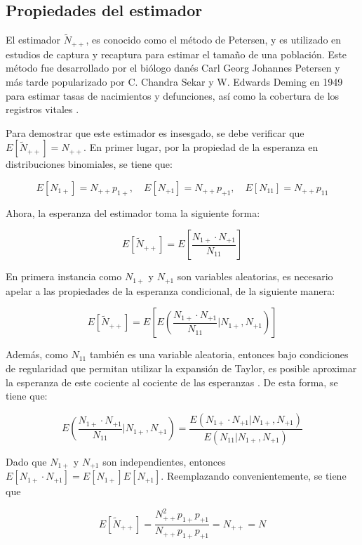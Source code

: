 \documentclass[
  12pt,
]{book}
\begin{document}
\hypertarget{propiedades-del-estimador}{%
\subsection{Propiedades del estimador}\label{propiedades-del-estimador}}

El estimador \(\tilde N_{++}\), es conocido como el método de Petersen, y es utilizado en estudios de captura y recaptura para estimar el tamaño de una población. Este método fue desarrollado por el biólogo danés Carl Georg Johannes Petersen \citep{petersen1896} y más tarde popularizado por C. Chandra Sekar y W. Edwards Deming en 1949 para estimar tasas de nacimientos y defunciones, así como la cobertura de los registros vitales \citep{sekar1949}.

Para demostrar que este estimador es insesgado, se debe verificar que \(E[\tilde{N}_{++}] = N_{++}\). En primer lugar, por la propiedad de la esperanza en distribuciones binomiales, se tiene que:

\[
E[N_{1+}] = N_{++} p_{1+}, \quad E[N_{+1}] = N_{++} p_{+1}, \quad E[N_{11}] = N_{++} p_{11}
\]

Ahora, la esperanza del estimador toma la siguiente forma:

\[
E[\tilde{N}_{++}] = E\left[ \frac{N_{1+} \cdot N_{+1}}{N_{11}} \right]
\]

En primera instancia como \(N_{1+}\) y \(N_{+1}\) son variables aleatorias, es necesario apelar a las propiedades de la esperanza condicional, de la siguiente manera:

\[
E[\tilde{N}_{++}] = E \left[ E \left( \frac{N_{1+} \cdot N_{+1}}{N_{11}} \Bigg| N_{1+}, N_{+1} \right) \right]
\]

Además, como \(N_{11}\) también es una variable aleatoria, entonces bajo condiciones de regularidad que permitan utilizar la expansión de Taylor, es posible aproximar la esperanza de este cociente al cociente de las esperanzas \citep{casella2002statistical}. De esta forma, se tiene que:

\[
E \left( \frac{N_{1+} \cdot N_{+1}}{N_{11}} \Bigg| N_{1+}, N_{+1} \right) =  \frac{E (N_{1+} \cdot N_{+1}| N_{1+}, N_{+1} )}{E (N_{11}| N_{1+}, N_{+1} )} 
\]

Dado que \(N_{1+}\) y \(N_{+1}\) son independientes, entonces \(E[N_{1+} \cdot N_{+1}] = E[N_{1+}] E[N_{+1}]\). Reemplazando convenientemente, se tiene que

\[
E[\tilde{N}_{++}] = \frac{N_{++}^2 p_{1+} p_{+1}}{N_{++} p_{1+} p_{+1}} 
= N_{++} = N
\]
\end{document}
